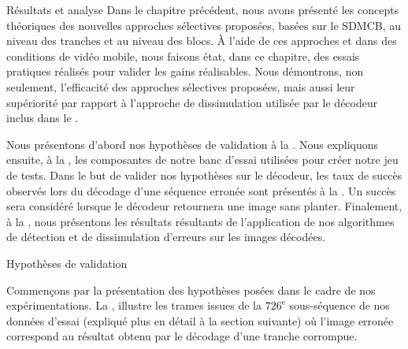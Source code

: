 \begin{chapter}{Résultats et analyse}
\label{chap-resultats}
Dans le chapitre précédent, nous avons présenté les concepts théoriques des
nouvelles approches sélectives proposées, basées sur le SDMCB, au niveau des
tranches et au niveau des blocs. À l'aide de ces approches et dans des
conditions de vidéo mobile, nous faisons état, dans ce chapitre, des essais
pratiques réalisés pour valider les gains réalisables. Nous démontrons, non
seulement, l'efficacité des approches sélectives proposées, mais aussi leur
supériorité par rapport à l'approche de dissimulation utilisée par le décodeur
inclus dans le \ltCodec.

Nous présentons d'abord nos hypothèses de validation à la
. Nous expliquons ensuite, à la
, les composantes de notre banc d'essai utilisées pour créer
notre jeu de tests. Dans le but de valider nos hypothèses sur le décodeur, les
taux de succès observés lors du décodage d'une séquence erronée sont présentés à
la . Un succès sera considéré lorsque le décodeur
retournera une image sans planter. Finalement, à la
, nous présentons les résultats résultants de
l'application de nos algorithmes de détection et de dissimulation d'erreurs sur
les images décodées.

\begin{section}{Hypothèses de validation}
\label{sec-Hypotheses-validation}

Commençons par la présentation des hypothèses posées dans le cadre de nos
expérimentations. La , illustre les trames issues de la
$726^{\text{e}}$ sous-séquence de nos données d'essai (expliqué plus en détail à
la section suivante) où l'image erronée  correspond au
résultat obtenu par le décodage d'une tranche corrompue.


\end{section}
\end{chapter}
